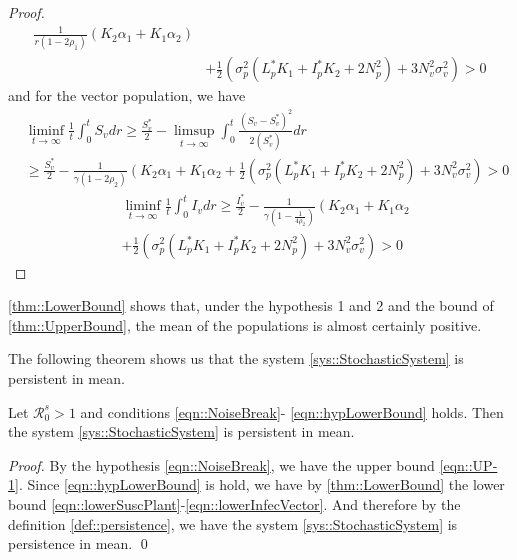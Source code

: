 \begin{proof}
\begin{align*}
	 	\frac{1}{ r (1 - 2 \rho_1)}
	 	\left(
	 		K_2 \alpha_1 + 
	 		K_1 \alpha_2 
	 	\right)
	 	\\
 		&+
 		\frac{1}{2}
 		\left(
 			\sigma_p ^ 2
 			(
 				L_p ^* K_1 + 
 				I_p ^* K_2 + 
 				2 N_p ^ 2
 			) + 
 			3 N_v ^ 2
 			\sigma_v ^ 2
 		\right)>0
	\end{align*}
	and for the vector population, we have
	\begin{align*}
	 	&
	 	\liminf
	 	\limits_{t \to \infty}
	 	\frac{1}{t}
	 	\int_{0} ^ {t} 
	 		S_v 
	 	dr
	 	\geq
	 	\frac{S_v^*}{2}
	 	-
	 	\limsup_{t\to \infty}
	 	\int_{0} ^ {t}
	 	\frac{(S_v - S_v^*) ^ 2}{2 (S_v ^* )}dr
	 	\\
	 	&\geq
	 	\frac{S_v ^* }{2} - 
	 	\frac{1}{\gamma(1-2\rho_2)}
	 	\left(
	 		K_2 \alpha_1 + 
	 		K_1 \alpha_2
	 	\right.+
 		\frac{1}{2}
 		\left(
 			\sigma_p^2
 			(
 				L_p ^* K_1 + 
 				I_p ^* K_2 + 
 				2N_p ^2
 			) + 
 			3N_v ^ 2
 			\sigma_v ^ 2
 		\right) >0
	\end{align*}
%
 \begin{align*}
	 	&
	 	\liminf\limits_{t \to \infty}
	 	\frac{1}{t}\int_{0}^{t} I_v dr
	 	\geq
 		\frac{I_v^*}{2} - 
 		\frac{1}{
 			\gamma
 			(
 				1 - 
 				\frac{1}{4\rho_2}
 			)}
 		\left(
 			K_2 \alpha_1 + 
 			K_1 \alpha_2
 		\right.\\
	 	&+
	 	\frac{1}{2}
	 	\left(
	 		\sigma_p ^ 2
	 		(
	 			L_p ^* K_1 + 
	 			I_p ^ *K_2 + 
	 			2N_p ^ 2
	 		) + 
	 		3N_v ^ 2
	 		\sigma_v ^ 2
	 	\right)
	 	>0
 \end{align*}
\end{proof}
%
\begin{remark}
	\autoref{thm::LowerBound} shows that, under the hypothesis 1 and 2
	and the bound of \autoref{thm::UpperBound}, the mean of the 
	populations is almost certainly positive. 
\end{remark}
The following theorem shows us that the system \autoref{sys::StochasticSystem} is persistent in mean.
\begin{theorem}
	Let $\mathcal{R}^s_0>1$ and conditions \autoref{eqn::NoiseBreak}-
	\autoref{eqn::hypLowerBound} holds. 
	Then the system \autoref{sys::StochasticSystem} is persistent in mean.
\end{theorem}
\begin{proof}
	By the hypothesis \autoref{eqn::NoiseBreak}, we have the upper bound \autoref{eqn::UP-1}. 
	Since \autoref{eqn::hypLowerBound} is hold, we have by \autoref{thm::LowerBound} 
	the lower bound \autoref{eqn::lowerSuscPlant}-\autoref{eqn::lowerInfecVector}. 
	And therefore by the definition \autoref{def::persistence},
	we have the system \autoref{sys::StochasticSystem} is persistence in mean.
	\qed
\end{proof}
